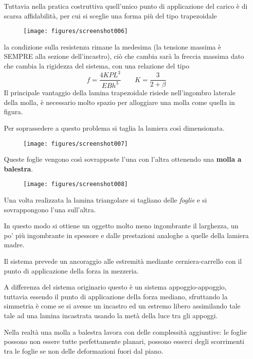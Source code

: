 \documentclass[a4paper, 15pt]{article}
\begin{document}
\begin{adjustwidth}{2in}{}
Tuttavia nella pratica costruttiva quell'unico punto di applicazione del carico è di scarsa affidabilità, per cui si sceglie una forma più del tipo trapezoidale
\begin{figure}[H]
	\centering
	\texttt{[image: figures/screenshot006]}
	\label{fig:screenshot006}
\end{figure}
la condizione sulla resistenza rimane la medesima (la tensione massima è SEMPRE alla sezione dell'incastro), ciò che cambia  sarà la freccia massima dato che cambia la rigidezza del sistema, con una relazione del tipo
\[f = \dfrac{4KPL^3}{EBh^3} \qquad K = \dfrac{3}{2+\beta}\]
Il principale vantaggio della lamina trapezoidale risiede  nell'ingombro laterale della molla, è necessario molto spazio per alloggiare una molla come quella in figura. \newline 

Per soprassedere a questo problema si taglia la lamiera così dimensionata.
\begin{figure}[H]
	\centering
	\texttt{[image: figures/screenshot007]}
	\label{fig:screenshot007}
\end{figure}
Queste foglie vengono così sovrapposte l'una con l'altra ottenendo una \textbf{molla a balestra}.
\begin{figure}[H]
	\centering
	\texttt{[image: figures/screenshot008]}
	\label{fig:screenshot008}
\end{figure}
Una volta realizzata la lamina triangolare si tagliano delle \textit{foglie} e si sovrappongono l'una sull'altra. 

In questo modo si ottiene un oggetto molto meno ingombrante il larghezza, un po' più ingombrante in spessore e dalle prestazioni analoghe a quelle della lamiera madre. 

Il sistema prevede un ancoraggio alle estremità mediante cerniera-carrello con  il punto di applicazione della forza in mezzeria. 

A differenza del sistema originario questo è un sistema appoggio-appoggio, tuttavia essendo il punto di applicazione della forza mediano, sfruttando la simmetria è come se si avesse un incastro ed un estremo libero assimilando tale tale ad una lamina incastrata usando la metà della luce tra gli appoggi. \newline 

Nella realtà una molla a balestra lavora con delle complessità aggiuntive: le foglie  possono non essere tutte perfettamente planari, possono esserci degli scorrimenti tra le foglie se non delle deformazioni fuori dal piano. 


\end{adjustwidth}
\end{document}
